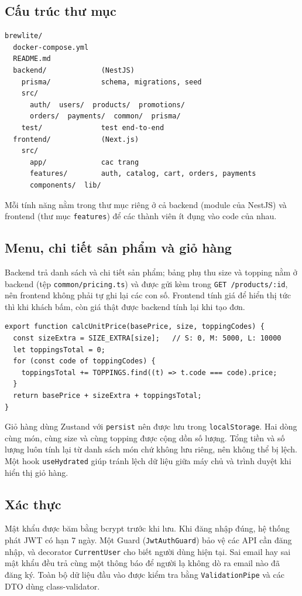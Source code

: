 \documentclass[a4paper]{article}
\begin{document}
\subsection{Cấu trúc thư mục}
\begin{lstlisting}[style=brew,language={}]
brewlite/
  docker-compose.yml
  README.md
  backend/             (NestJS)
    prisma/            schema, migrations, seed
    src/
      auth/  users/  products/  promotions/
      orders/  payments/  common/  prisma/
    test/              test end-to-end
  frontend/            (Next.js)
    src/
      app/             cac trang
      features/        auth, catalog, cart, orders, payments
      components/  lib/
\end{lstlisting}
Mỗi tính năng nằm trong thư mục riêng ở cả backend (module của NestJS) và frontend (thư mục \texttt{features}) để các thành viên ít đụng vào code của nhau.

\subsection{Menu, chi tiết sản phẩm và giỏ hàng}
Backend trả danh sách và chi tiết sản phẩm; bảng phụ thu size và topping nằm ở backend (tệp \texttt{common/pricing.ts}) và được gửi kèm trong \texttt{GET /products/:id}, nên frontend không phải tự ghi lại các con số. Frontend tính giá để hiển thị tức thì khi khách bấm, còn giá thật được backend tính lại khi tạo đơn.

\begin{lstlisting}[style=brew]
export function calcUnitPrice(basePrice, size, toppingCodes) {
  const sizeExtra = SIZE_EXTRA[size];   // S: 0, M: 5000, L: 10000
  let toppingsTotal = 0;
  for (const code of toppingCodes) {
    toppingsTotal += TOPPINGS.find((t) => t.code === code).price;
  }
  return basePrice + sizeExtra + toppingsTotal;
}
\end{lstlisting}

Giỏ hàng dùng Zustand với \texttt{persist} nên được lưu trong \texttt{localStorage}. Hai dòng cùng món, cùng size và cùng topping được cộng dồn số lượng. Tổng tiền và số lượng luôn tính lại từ danh sách món chứ không lưu riêng, nên không thể bị lệch. Một hook \texttt{useHydrated} giúp tránh lệch dữ liệu giữa máy chủ và trình duyệt khi hiển thị giỏ hàng.

\subsection{Xác thực}
Mật khẩu được băm bằng bcrypt trước khi lưu. Khi đăng nhập đúng, hệ thống phát JWT có hạn 7 ngày. Một Guard (\texttt{JwtAuthGuard}) bảo vệ các API cần đăng nhập, và decorator \texttt{CurrentUser} cho biết người dùng hiện tại. Sai email hay sai mật khẩu đều trả cùng một thông báo để người lạ không dò ra email nào đã đăng ký. Toàn bộ dữ liệu đầu vào được kiểm tra bằng \texttt{ValidationPipe} và các DTO dùng class-validator.
\end{document}
